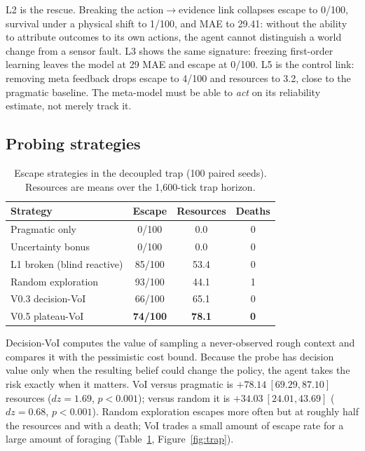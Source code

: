 \documentclass{article}
\begin{document}
L2 is the rescue. Breaking the action$\rightarrow$evidence link collapses escape to 0/100, survival under a physical shift to 1/100, and MAE to 29.41: without the ability to attribute outcomes to its own actions, the agent cannot distinguish a world change from a sensor fault. L3 shows the same signature: freezing first-order learning leaves the model at 29 MAE and escape at 0/100. L5 is the control link: removing meta feedback drops escape to 4/100 and resources to 3.2, close to the pragmatic baseline. The meta-model must be able to \emph{act} on its reliability estimate, not merely track it.

\subsection{Probing strategies}

\begin{table}[t]
\centering
\small
\caption{Escape strategies in the decoupled trap (100 paired seeds). Resources are means over the 1{,}600-tick trap horizon.}
\label{tab:trap}
\begin{tabular}{lccc}
\toprule
Strategy & Escape & Resources & Deaths \\
\midrule
Pragmatic only & 0/100 & 0.0 & 0 \\
Uncertainty bonus & 0/100 & 0.0 & 0 \\
L1 broken (blind reactive) & 85/100 & 53.4 & 0 \\
Random exploration & 93/100 & 44.1 & 1 \\
V0.3 decision-VoI & 66/100 & 65.1 & 0 \\
V0.5 plateau-VoI & \textbf{74/100} & \textbf{78.1} & \textbf{0} \\
\bottomrule
\end{tabular}
\end{table}

Decision-VoI computes the value of sampling a never-observed rough context and compares it with the pessimistic cost bound. Because the probe has decision value only when the resulting belief could change the policy, the agent takes the risk exactly when it matters. VoI versus pragmatic is $\mathbf{+78.14\ [69.29,87.10]}$ resources ($dz=1.69$, $p<0.001$); versus random it is $\mathbf{+34.03\ [24.01,43.69]}$ ($dz=0.68$, $p<0.001$). Random exploration escapes more often but at roughly half the resources and with a death; VoI trades a small amount of escape rate for a large amount of foraging (Table~\ref{tab:trap}, Figure~\ref{fig:trap}).
\end{document}
